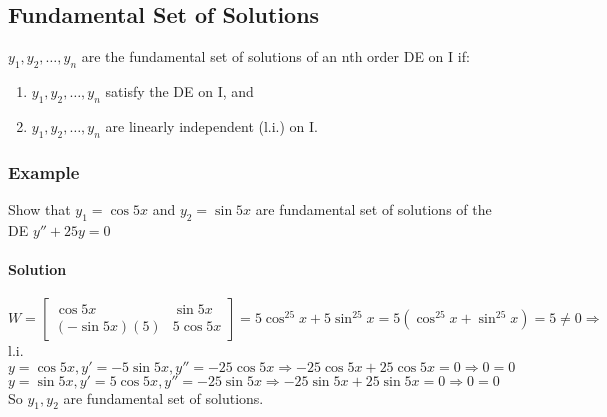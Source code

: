 \documentclass{article}
\begin{document}
\subsection{Fundamental Set of Solutions}
$y_1,y_2,\dots,y_n$ are the fundamental set of solutions of an nth order DE on I if: \begin{enumerate}
    \item $y_1,y_2,\dots,y_n$ satisfy the DE on I, and
    \item $y_1,y_2,\dots,y_n$ are linearly independent (l.i.) on I.
\end{enumerate}

\subsubsection{Example}
Show that $y_1=\cos5x$ and $y_2=\sin5x$ are fundamental set of solutions of the DE $y''+25y=0$
\paragraph{Solution} $W=\begin{bmatrix}
    \cos5x & \sin5x \\
    (-\sin5x)(5) & 5\cos5x
\end{bmatrix}=5\cos^25x+5\sin^25x=5(\cos^25x+\sin^25x)=5\neq0\Rightarrow$ l.i.
\\$y=\cos5x,y'=-5\sin5x,y''=-25\cos5x\Rightarrow -25\cos5x+25\cos5x=0\Rightarrow0=0$
\\$y=\sin5x,y'=5\cos5x,y''=-25\sin5x\Rightarrow -25\sin5x+25\sin5x=0\Rightarrow0=0$
\\So $y_1,y_2$ are fundamental set of solutions.
\end{document}
